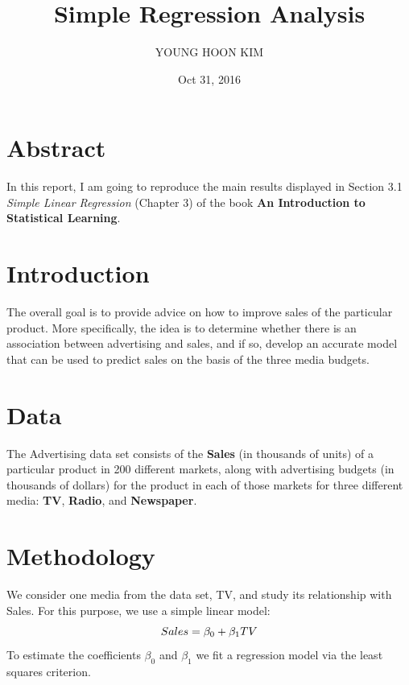 \documentclass{article}\usepackage[]{graphicx}\usepackage[]{color}
\title{Simple Regression Analysis}
\author{YOUNG HOON KIM}
\date{Oct 31, 2016}
\begin{document}
\maketitle



\section*{Abstract} In this report, I am going to reproduce the main results displayed in Section 3.1 \emph{Simple Linear Regression} (Chapter 3) of the book \textbf{An Introduction to Statistical Learning}.

\section*{Introduction} The overall goal is to provide advice on how to improve sales of the particular product. More specifically, the idea is to determine whether there is an association between advertising and sales, and if so, develop an accurate model that can be used to predict sales on the basis of the three media budgets.  

\section*{Data} The Advertising data set consists of the \textbf{Sales} (in thousands of units) of a particular product in 200 different markets, along with advertising budgets (in thousands of dollars) for the product in each of those markets for three different media: \textbf{TV}, \textbf{Radio}, and \textbf{Newspaper}.

\section*{Methodology}
We consider one media from the data set, TV, and study its relationship with Sales. For this purpose, we use a simple linear model:
\begin{equation}
\centering
Sales= \beta_0 + \beta_1TV
\end{equation}
To estimate the coefficients $\beta_0$ and $\beta_1$ we fit a regression model via the least squares criterion.
\end{document}
